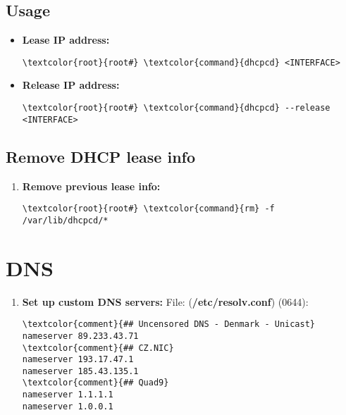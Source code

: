 \documentclass[10pt, a4paper, onecolumn, openany]{book} %
\begin{document}
\subsection{Usage}
\begin{itemize}
    \item \textbf{Lease IP address:}
\begin{Verbatim}[commandchars=\\\{\}]
\textcolor{root}{root#} \textcolor{command}{dhcpcd} <INTERFACE>
\end{Verbatim}
    \item \textbf{Release IP address:}
\begin{Verbatim}[commandchars=\\\{\}]
\textcolor{root}{root#} \textcolor{command}{dhcpcd} --release <INTERFACE>
\end{Verbatim}
\end{itemize}
\subsection{Remove DHCP lease info}
\begin{enumerate}
    \item \textbf{Remove previous lease info:}
\begin{Verbatim}[commandchars=\\\{\}]
\textcolor{root}{root#} \textcolor{command}{rm} -f /var/lib/dhcpcd/*
\end{Verbatim}
\end{enumerate}
\section{DNS}
\begin{enumerate}
    \item \textbf{Set up custom DNS servers:}
\newline File: (\textbf{\textcolor{file}{/etc/resolv.conf}}) (0644):
\begin{Verbatim}[commandchars=\\\{\}]
\textcolor{comment}{## Uncensored DNS - Denmark - Unicast}
nameserver 89.233.43.71
\textcolor{comment}{## CZ.NIC}
nameserver 193.17.47.1
nameserver 185.43.135.1
\textcolor{comment}{## Quad9}
nameserver 1.1.1.1
nameserver 1.0.0.1
\end{Verbatim}
\end{enumerate}
\end{document}
